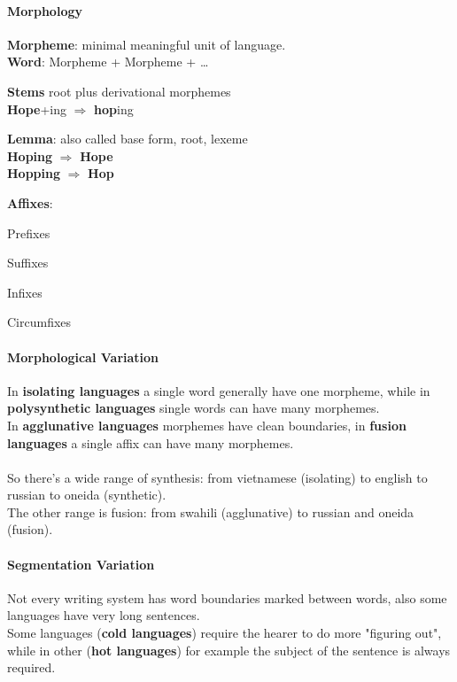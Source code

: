 \documentclass[10pt]{report}
\begin{document}
\paragraph{Morphology}
\begin{list}{}{}
	\item \textbf{Morpheme}: minimal meaningful unit of language.\\
	\textbf{Word}: Morpheme + Morpheme + \ldots
	\item \textbf{Stems} root plus derivational morphemes\\
	\textbf{Hope}+ing $\Rightarrow$ \textbf{hop}ing
	\item \textbf{Lemma}: also called base form, root, lexeme\\
	\textbf{Hoping} $\Rightarrow$ \textbf{Hope}\\
	\textbf{Hopping} $\Rightarrow$ \textbf{Hop}
	\item \textbf{Affixes}: \begin{list}{}{}
		\item Prefixes
		\item Suffixes
		\item Infixes
		\item Circumfixes
	\end{list}
\end{list}
\paragraph{Morphological Variation}
In \textbf{isolating languages} a single word generally have one morpheme, while in \textbf{polysynthetic languages} single words can have many morphemes.\\
In \textbf{agglunative languages} morphemes have clean boundaries, in \textbf{fusion languages} a single affix can have many morphemes.\\\\
So there's a wide range of synthesis: from vietnamese (isolating) to english to russian to oneida (synthetic).\\
The other range is fusion: from swahili (agglunative) to russian and oneida (fusion).
\paragraph{Segmentation Variation} Not every writing system has word boundaries marked between words, also some languages have very long sentences.\\
Some languages (\textbf{cold languages}) require the hearer to do more "figuring out", while in other (\textbf{hot languages}) for example the subject of the sentence is always required.
\end{document}
